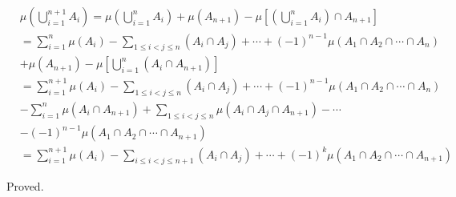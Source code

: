 \documentclass{article}
\begin{document}
\begin{equation*}
\begin{split}
&\mu(\bigcup_{i=1}^{n+1}A_i)=\mu(\bigcup_{i=1}^nA_i)+\mu(A_{n+1})
-\mu[(\bigcup_{i=1}^nA_i)\cap A_{n+1}]\\
&=\sum_{i=1}^n\mu(A_i)-\sum_{1\leq i <j\leq n}(A_i\cap A_j) + \cdots + 
(-1)^{n-1}\mu(A_1\cap A_2\cap\cdots\cap A_n)\\
&+\mu(A_{n+1})-\mu[\bigcup_{i=1}^n(A_i\cap A_{n+1})]\\
&=\sum_{i=1}^{n+1}\mu(A_i)-\sum_{1\leq i <j\leq n}(A_i\cap A_j) + \cdots + 
(-1)^{n-1}\mu(A_1\cap A_2\cap\cdots\cap A_n)\\
&-\sum_{i=1}^n\mu(A_i\cap A_{n+1})+\sum_{1\leq i < j \leq n}\mu(A_i\cap A_j\cap A_{n+1})
-\cdots\\&-(-1)^{n-1}\mu(A_1\cap A_2\cap\cdots\cap A_{n+1})\\
&=\sum_{i=1}^{n+1}\mu(A_i)-\sum_{i\leq i < j\leq n+1}(A_i\cap A_j)+\cdots+
(-1)^k\mu(A_1\cap A_2\cap\cdots\cap A_{n+1})
\end{split}
\end{equation*}

Proved.
\end{document}
